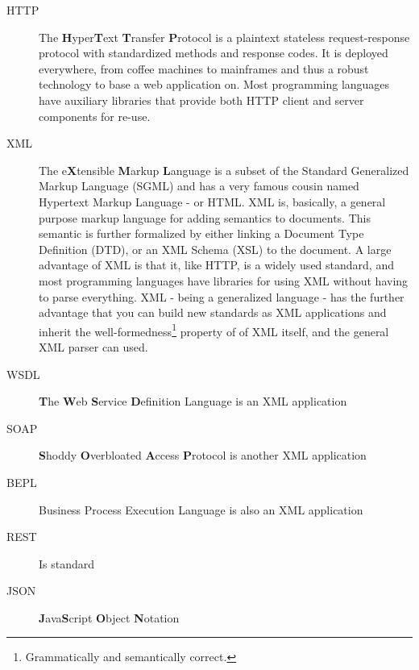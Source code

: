 \begin{description}
\item[HTTP] The \textbf{H}yper\textbf{T}ext \textbf{T}ransfer \textbf{P}rotocol is a plaintext stateless request-response protocol with standardized methods and response codes. It is deployed everywhere, from coffee machines to mainframes and thus a robust technology to base a web application on. Most programming languages have auxiliary libraries that provide both HTTP client and server components for re-use.
\item[XML] The e\textbf{X}tensible \textbf{M}arkup \textbf{L}anguage is a subset of the Standard Generalized Markup Language (SGML) and has a very famous cousin named Hypertext Markup Language - or HTML. XML is, basically, a general purpose markup language for adding semantics to documents. This semantic is further formalized by either linking a Document Type Definition (DTD), or an XML Schema (XSL) to the document. A large advantage of XML is that it, like HTTP, is a widely used standard, and most programming languages have libraries for using XML without having to parse everything. XML - being a generalized language - has the further advantage that you can build new standards as XML applications and inherit the well-formedness\footnote{Grammatically and semantically correct.} property of of XML itself, and the general XML parser can used.
\item[WSDL] \textbf{T}he \textbf{W}eb \textbf{S}ervice \textbf{D}efinition Language is an XML application 

\item[SOAP] \textbf{S}hoddy \textbf{O}verbloated \textbf{A}ccess \textbf{P}rotocol is another XML application %
\item[BEPL] Business Process Execution Language is also an XML application

\item[REST] Is standard 
\item[JSON] \textbf{J}ava\textbf{S}cript \textbf{O}bject \textbf{N}otation

\end{description}